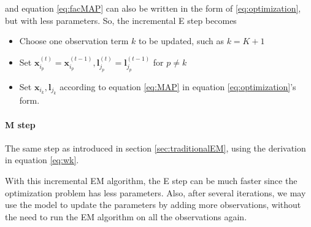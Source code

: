 and equation \ref{eq:facMAP} can also be written in the form of \ref{eq:optimization}, but with less parameters. So, the incremental E step becomes
\begin{itemize}
\item Choose one observation term $k$ to be updated, such as $k = K+1$
\item Set $\boldsymbol{x}_{i_p}^{(t)} = \boldsymbol{x}_{i_p}^{(t-1)}, \boldsymbol{l}_{j_p}^{(t)} = \boldsymbol{l}_{j_p}^{(t-1)}$ for $p \neq k$
\item Set $\boldsymbol{x}_{i_k}, \boldsymbol{l}_{j_k}$ according to equation \ref{eq:MAP} in equation \ref{eq:optimization}'s form.
\end{itemize}
\paragraph{M step} The same step as introduced in section \ref{sec:traditionalEM}, using the derivation in equation \ref{eq:wk}.

With this incremental EM algorithm, the E step can be much faster since the optimization problem has less parameters. Also, after several iterations, we may use the model to update the parameters by adding more observations, without the need to run the EM algorithm on all the observations again.
